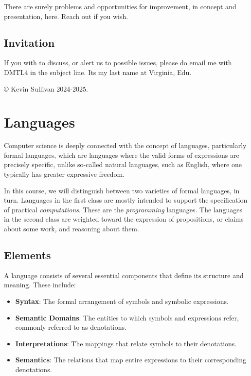 \documentclass{book}
\providecommand{\tightlist}{%
  \setlength{\itemsep}{0pt}\setlength{\parskip}{0pt}}
\begin{document}
There are surely problems and opportunities for improvement, in concept and presentation, here. Reach out if you wish.

\hypertarget{book__pandoc__debug__src__preface.md__invitation}{%
\section*{Invitation}\label{book__pandoc__debug__src__preface.md__invitation}}

If you with to discuss, or alert us to possible issues, please do email me with DMTL4 in the subject line. It\textquotesingle s my last name at Virginia, Edu.

© Kevin Sullivan 2024-2025.

\hypertarget{book__pandoc__debug__src__languages.md}{}
\hypertarget{book__pandoc__debug__src__languages.md__languages}{%
\chapter{Languages}\label{book__pandoc__debug__src__languages.md__languages}}

Computer science is deeply connected with the concept of languages,
particularly formal languages, which are languages where the valid
forms of expressions are precisely specific, unlike so-called natural
languages, such as English, where one typically has greater expressive
freedom.

In this course, we will distinguish between two varieties of formal
languages, in turn. Languages in the first class are mostly intended
to support the specification of practical \emph{computations}. These are
the \emph{programming} languages. The languages in the second class are
weighted toward the expression of propositions, or claims about some
work, and reasoning about them.

\hypertarget{book__pandoc__debug__src__languages.md__elements}{%
\section*{Elements}\label{book__pandoc__debug__src__languages.md__elements}}

A language consists of several essential components that define its structure and meaning. These include:

\begin{itemize}
\tightlist
\item
  \textbf{Syntax}: The formal arrangement of symbols and symbolic expressions.
\item
  \textbf{Semantic Domains}: The entities to which symbols and expressions refer, commonly referred to as denotations.
\item
  \textbf{Interpretations}: The mappings that relate symbols to their denotations.
\item
  \textbf{Semantics}: The relations that map entire expressions to their corresponding denotations.
\end{itemize}
\end{document}
